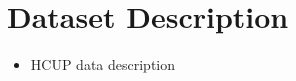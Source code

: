 \section{Dataset Description}
\label{datadesc}
\begin{itemize}
	\item HCUP data description
\end{itemize}





